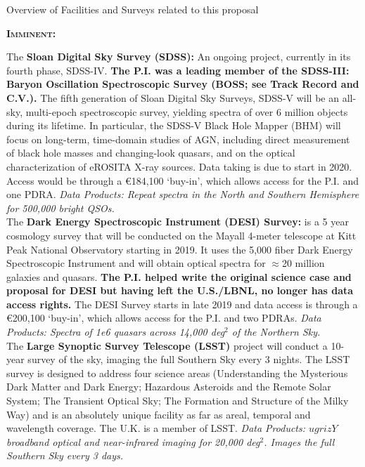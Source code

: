 
\begin{framed}
 \begin{tcolorbox}
   \begin{center} 
     Overview of Facilities and Surveys related to this proposal
   \end{center}
 \end{tcolorbox}
  
\noindent
\textbf{\textsc{Imminent:}}

The {\bf Sloan Digital Sky Survey (SDSS):} An ongoing project,
currently in its fourth phase, SDSS-IV.  {\bf The P.I. was a leading
member of the SDSS-III: Baryon Oscillation Spectroscopic Survey (BOSS;
see Track Record and C.V.).} The fifth generation of Sloan Digital Sky
Surveys, SDSS-V will be an all-sky, multi-epoch spectroscopic survey,
yielding spectra of over 6 million objects during its lifetime. In
particular, the SDSS-V Black Hole Mapper (BHM) will focus on
long-term, time-domain studies of AGN, including direct measurement of
black hole masses and changing-look quasars, and on the optical
characterization of eROSITA X-ray sources. Data taking is due to start
in 2020. Access would be through a \euro184,100 `buy-in', which allows
access for the P.I. and one PDRA.  {\it Data Products: Repeat spectra
in the North and Southern Hemisphere for 500,000 bright QSOs.} \\

The {\bf Dark Energy Spectroscopic Instrument (DESI) Survey:} is a 5
year cosmology survey that will be conducted on the Mayall 4-meter
telescope at Kitt Peak National Observatory starting in 2019. It uses
the 5,000 fiber Dark Energy Spectroscopic Instrument and will obtain
optical spectra for $\approx$20 million galaxies and quasars.  {\bf
The P.I. helped write the original science case and proposal for DESI
\citep{Schlegel2011} but having left the U.S./LBNL, no longer has data
access rights.}  The DESI Survey starts in late 2019 and data access
is through a \euro200,100 `buy-in', which allows access for the
P.I. and two PDRAs.  {\it Data Products: Spectra of 1e6 quasars across
14,000 deg$^{2}$ of the Northern Sky.} \\

The {\bf Large Synoptic Survey Telescope (LSST)} project will conduct
a 10-year survey of the sky, imaging the full Southern Sky every 3
nights. The LSST survey is designed to address four science areas
(Understanding the Mysterious Dark Matter and Dark Energy; Hazardous
Asteroids and the Remote Solar System; The Transient Optical Sky; The
Formation and Structure of the Milky Way) and is an absolutely unique
facility as far as areal, temporal and wavelength coverage. The U.K.
is a member of LSST.  {\it Data Products: $ugrizY$ broadband optical
and near-infrared imaging for 20,000 deg$^2$.  Images the full
Southern Sky every 3 days.} \\


\end{framed}
